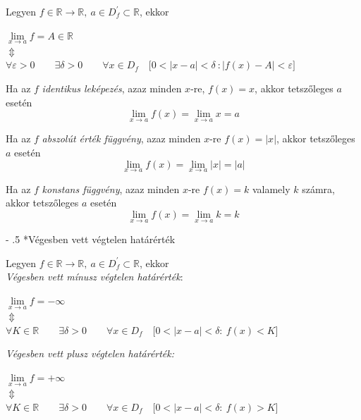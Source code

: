 \documentclass[tikz,12pt,margin=0px]{article}
\makeatletter
\renewcommand\paragraph{%
	\@startsection{paragraph}{4}{0mm}%
	{-\baselineskip}%
	{.5\baselineskip}%
	{\normalfont\normalsize\bfseries}}
\makeatother
\begin{document}
    \noindent Legyen $f \in \mathbb{R} \rightarrow \mathbb{R},\ a \in D_{f}^{'} \subset \mathbb{R}$, ekkor
    \begin{center}
        $\lim\limits_{x \to a}^{}f = A \in \mathbb{R}$\\
        $\Updownarrow$\\
        $\forall \varepsilon > 0\qquad \exists \delta > 0\qquad \forall x \in D_{f}\quad \Big[0 < \big|x - a\big| < \delta\ : \big|f(x) - A\big| < \varepsilon\Big]$
    \end{center}

    {\footnotesize \noindent {\color{blue} \faLightbulbO\ $\triangleright$ } }
    {\footnotesize

    \noindent Ha az $f$ \emph{identikus leképezés}, azaz minden $x$-re, $f(x) = x$, akkor tetszőleges $a$ esetén
    \[
        \lim\limits_{x \to a}f(x) = \lim\limits_{x \to a}x = a
    \]

    \noindent Ha az $f$ \emph{abszolút érték függvény}, azaz minden  $x$-re $f(x) = \Big|x\Big|$, akkor tetszőleges $a$ esetén
    \[
        \lim\limits_{x \to a}f(x) = \lim\limits_{x \to a}\Big|x\Big| = \Big|a\Big|
    \]

    \noindent Ha az $f$ \emph{konstans függvény}, azaz minden  $x$-re $f(x) = k$ valamely $k$ számra, akkor tetszőleges $a$ esetén
    \[
        \lim\limits_{x \to a}f(x) = \lim\limits_{x \to a}k = k
    \]
    }
    \noindent {\footnotesize $\triangleleft$ \faLightbulbO }
\newpage
    \paragraph*{Végesben vett végtelen határérték\\}

    \noindent Legyen $f \in \mathbb{R} \rightarrow \mathbb{R},\ a \in D_{f}^{'} \subset \mathbb{R}$, ekkor\\

    \noindent \emph{Végesben vett mínusz végtelen határérték}:
    \begin{center}
        $\lim\limits_{x \to a}f = -\infty$\\
        $\Updownarrow$\\
        $\forall K \in \mathbb{R}\qquad \exists \delta > 0\qquad \forall x \in D_{f}\quad \Big[0 < \big|x - a\big| < \delta:\ f(x) \boldsymbol{<} K\Big]$
    \end{center}

    \noindent \emph{Végesben vett plusz végtelen határérték:}
    \begin{center}
        $\lim\limits_{x \to a}f = +\infty$\\
        $\Updownarrow$\\
        $\forall K \in \mathbb{R}\qquad \exists \delta > 0\qquad \forall x \in D_{f}\quad \Big[0 < \big|x - a\big| < \delta:\ f(x) \boldsymbol{>} K\Big]$
    \end{center}
\end{document}
